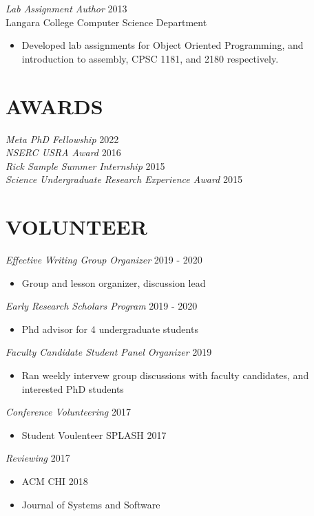 \documentclass[line,margin]{res}
\begin{document}
\begin{resume}
{\sl Lab Assignment Author} \hfill 2013\\
	Langara College Computer Science Department
	\begin{itemize} \itemsep -2pt
			\item Developed lab assignments for Object Oriented Programming, and introduction to assembly, CPSC 1181, and 2180 respectively.
	\end{itemize}
    

\section{AWARDS}
{\sl Meta PhD Fellowship} \hfill 2022 \\
{\sl NSERC USRA Award} \hfill 2016\\
{\sl Rick Sample Summer Internship} \hfill 2015\\
{\sl Science Undergraduate Research Experience Award} \hfill 2015\\


\section{VOLUNTEER}

{\sl Effective Writing Group Organizer} {\hfill 2019 - 2020}
    \begin{itemize}
        \item Group and lesson organizer, discussion lead
    \end{itemize}

{\sl Early Research Scholars Program} {\hfill 2019 - 2020}
    \begin{itemize}
        \item Phd advisor for 4 undergraduate students
    \end{itemize}

{\sl Faculty Candidate Student Panel Organizer} {\hfill 2019}
    \begin{itemize}
        \item Ran weekly intervew group discussions with faculty
            candidates, and interested PhD students
     \end{itemize}

{\sl Conference Volunteering} \hfill 2017
    \begin{itemize}
        \item Student Voulenteer SPLASH 2017
    \end{itemize}

{\sl Reviewing} \hfill 2017
    \begin{itemize}
        \item ACM CHI 2018
        \item Journal of Systems and Software
    \end{itemize}


\end{resume}
\end{document}
